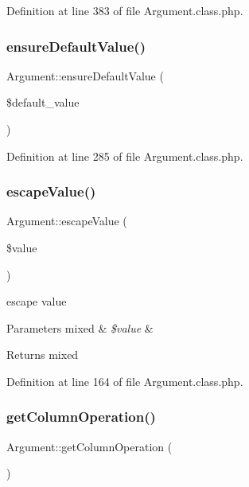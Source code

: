 Definition at line 383 of file Argument.\+class.\+php.

\hypertarget{classArgument_a4af92bc005f3d9328c63c0722fd3aef7}{}\label{classArgument_a4af92bc005f3d9328c63c0722fd3aef7} 
\subsubsection{\texorpdfstring{ensure\+Default\+Value()}{ensureDefaultValue()}}
{\footnotesize\ttfamily Argument\+::ensure\+Default\+Value (\begin{DoxyParamCaption}\item[{}]{\$default\+\_\+value }\end{DoxyParamCaption})}



Definition at line 285 of file Argument.\+class.\+php.

\hypertarget{classArgument_a217bae48930e0208210aa7030a2f2b27}{}\label{classArgument_a217bae48930e0208210aa7030a2f2b27} 
\subsubsection{\texorpdfstring{escape\+Value()}{escapeValue()}}
{\footnotesize\ttfamily Argument\+::escape\+Value (\begin{DoxyParamCaption}\item[{}]{\$value }\end{DoxyParamCaption})}

escape value 
\begin{DoxyParams}[1]{Parameters}
mixed & {\em \$value} & \\
\hline
\end{DoxyParams}
\begin{DoxyReturn}{Returns}
mixed 
\end{DoxyReturn}


Definition at line 164 of file Argument.\+class.\+php.

\hypertarget{classArgument_a8720ec6d3b4cccdb6dfdd072bb77c9d3}{}\label{classArgument_a8720ec6d3b4cccdb6dfdd072bb77c9d3} 
\subsubsection{\texorpdfstring{get\+Column\+Operation()}{getColumnOperation()}}
{\footnotesize\ttfamily Argument\+::get\+Column\+Operation (\begin{DoxyParamCaption}{ }\end{DoxyParamCaption})}



